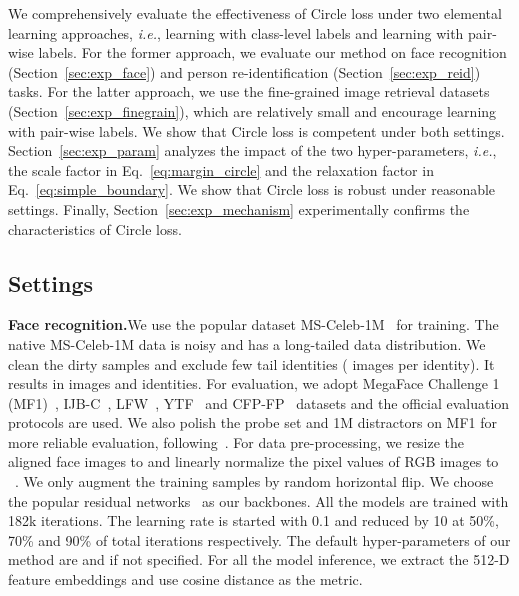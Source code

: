 \documentclass[10pt,twocolumn,letterpaper]{article}
\begin{document}
We comprehensively evaluate the effectiveness of Circle loss under two elemental learning approaches, \emph{i.e.}, learning with class-level labels and learning with pair-wise labels. For the former approach, we evaluate our method on face recognition (Section~\ref{sec:exp_face}) and person re-identification (Section~\ref{sec:exp_reid}) tasks. For the latter approach, we use the fine-grained image retrieval datasets (Section~\ref{sec:exp_finegrain}), which are relatively small and encourage learning with pair-wise labels. We show that Circle loss is competent under both settings. 
Section~\ref{sec:exp_param} analyzes the impact of the two hyper-parameters, \emph{i.e.}, the scale factor  in Eq.~\ref{eq:margin_circle} and the relaxation factor  in Eq.~\ref{eq:simple_boundary}. We show that Circle loss is robust under reasonable settings. Finally, Section~\ref{sec:exp_mechanism} experimentally confirms the characteristics of Circle loss.

\subsection{Settings}

\textbf{Face recognition.}\quad We use the popular dataset MS-Celeb-1M~\cite{guo2016ms} for training. The native MS-Celeb-1M data is noisy and has a long-tailed data distribution. We clean the dirty samples and exclude few tail identities ( images per identity). It results in  images and  identities. For evaluation, we adopt MegaFace Challenge 1 (MF1)~\cite{kemelmacher2016megaface}, IJB-C~\cite{maze2018iarpa}, LFW~\cite{LFWTech}, YTF~\cite{wolf2011face} and CFP-FP~\cite{cfp-paper} datasets and the official evaluation protocols are used. We also polish the probe set and 1M distractors on MF1 for more reliable evaluation, following~\cite{deng2019arcface}. For data pre-processing, we resize the aligned face images to  and linearly normalize the pixel values of RGB images to ~\cite{wen2016discriminative,liu2017sphereface,Wang_2018_CVPR}. We only augment the training samples by random horizontal flip. We choose the popular residual networks~\cite{he2016deep} as our backbones.
All the models are trained with 182k iterations. The learning rate is started with 0.1 and reduced by 10 at 50\%, 70\% and 90\% of total iterations respectively. The default hyper-parameters of our method are  and  if not specified. For all the model inference, we extract the 512-D feature embeddings and use cosine distance as the metric.
\end{document}
